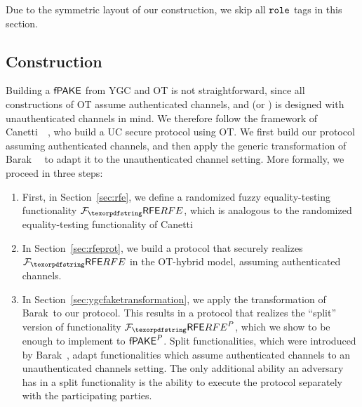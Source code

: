
Due to the symmetric layout of our construction, we skip all $\texttt{role}$ tags in this section.



\subsection{Construction}
\label{sec:YGCconstruction}

Building a $\textsf{fPAKE}$ from YGC and OT is not straightforward, since all constructions of OT assume authenticated channels, and \FAKE (or \PAKE) is designed with unauthenticated channels in mind.
We therefore follow the framework of Canetti~\etal~\cite{PKC:CDVW12}, who build a UC secure \PAKE protocol using OT.
We first build our protocol assuming authenticated channels, and then apply the generic transformation of Barak~\etal~\cite{C:BCLPR05} to adapt it to the unauthenticated channel setting.
More formally, we proceed in three steps:
\begin{enumerate}
\item 
First, in Section~\ref{sec:rfe}, we define a randomized fuzzy equality-testing functionality $\Frfe$, which is analogous to the randomized equality-testing functionality of Canetti~\etal 
\item
In Section~\ref{sec:rfeprot}, we build a protocol that securely realizes $\Frfe$ in the OT-hybrid model, assuming authenticated channels.
\item
In Section~\ref{sec:ygcfaketransformation}, we apply the transformation of Barak~\etal to our protocol.
This results in a protocol that realizes the ``split'' version of functionality $\Frfe^P$, which we show to be enough to implement to $\textsf{fPAKE}^{P}$.
Split functionalities, which were introduced by Barak~\etal, adapt functionalities which assume authenticated channels to an unauthenticated channels setting. 
The only additional ability an adversary has in a split functionality is the ability to execute the protocol separately with the participating parties.
\end{enumerate}









